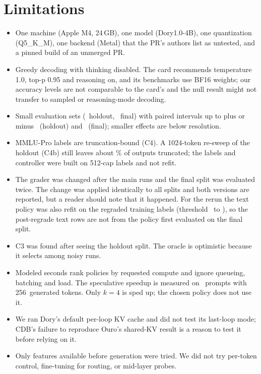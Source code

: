 \documentclass[11pt]{article}
\newcommand{\MemGb}{24}
\newcommand{\SpecTokens}{256}
\begin{document}
\section{Limitations}
\begin{itemize}
\item One machine (Apple M4, \MemGb\,GB), one model (Dory1.0-4B), one quantization (Q5\_K\_M), one backend (Metal) that the PR's authors list as untested, and a pinned build of an unmerged PR.
\item Greedy decoding with thinking disabled. The card recommends temperature 1.0, top-p 0.95 and reasoning on, and its benchmarks use BF16 weights; our accuracy levels are not comparable to the card's and the null result might not transfer to sampled or reasoning-mode decoding.
\item Small evaluation sets (\HoldoutN\ holdout, \FinalN\ final) with paired intervals up to plus or minus \HoldoutCiHalf\ (holdout) and \FinalCiHalf\ (final); smaller effects are below resolution.
\item MMLU-Pro labels are truncation-bound (C4). A 1024-token re-sweep of the holdout (C4b) still leaves about \MmluCapFourTruncBigCap\% of outputs truncated; the labels and controller were built on 512-cap labels and not refit.
\item The grader was changed after the main runs and the final split was evaluated twice. The change was applied identically to all splits and both versions are reported, but a reader should note that it happened. For the rerun the text policy was also refit on the regraded training labels (threshold \FinalPreTextTau\ to \FinalTextTau), so the post-regrade text rows are not from the policy first evaluated on the final split.
\item C3 was found after seeing the holdout split. The oracle is optimistic because it selects among noisy runs.
\item Modeled seconds rank policies by requested compute and ignore queueing, batching and load. The speculative speedup is measured on \SpecPrompts\ prompts with \SpecTokens\ generated tokens. Only $k{=}4$ is sped up; the chosen policy does not use it.
\item We ran Dory's default per-loop KV cache and did not test its last-loop mode; CDB's failure to reproduce Ouro's shared-KV result \citep[App.~E.1]{cdb2026} is a reason to test it before relying on it.
\item Only features available before generation were tried. We did not try per-token control, fine-tuning for routing, or mid-layer probes.

\end{itemize}
\end{document}
